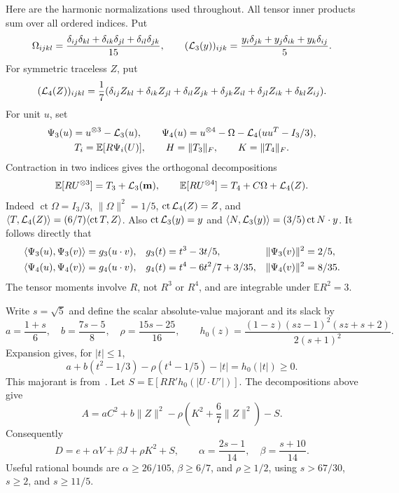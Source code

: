 \documentclass[11pt]{article}
\theoremstyle{remark}\newtheorem{remark}[theorem]{Remark}
\newcommand{\E}{\mathbb E}
\numberwithin{equation}{section}
\begin{document}
Here are the harmonic normalizations used throughout. All tensor inner
products sum over all ordered indices. Put
\[
 \Omega_{ijkl}=\frac{\delta_{ij}\delta_{kl}+\delta_{ik}\delta_{jl}
                           +\delta_{il}\delta_{jk}}{15},
 \qquad
 ({\cal L}_3(y))_{ijk}
       =\frac{y_i\delta_{jk}+y_j\delta_{ik}+y_k\delta_{ij}}5.
\]
For symmetric traceless $Z$, put
\[
 ({\cal L}_4(Z))_{ijkl}=\frac17(\delta_{ij}Z_{kl}+\delta_{ik}Z_{jl}
 +\delta_{il}Z_{jk}+\delta_{jk}Z_{il}+\delta_{jl}Z_{ik}+\delta_{kl}Z_{ij}).
\]
For unit $u$, set
\[
 \begin{gathered}
 \Psi_3(u)=u^{\otimes3}-{\cal L}_3(u),\qquad
 \Psi_4(u)=u^{\otimes4}-\Omega-{\cal L}_4(uu^T-I_3/3),\\
 T_i=\E[R\Psi_i(U)],\qquad H=\|T_3\|_F,\qquad K=\|T_4\|_F.
 \end{gathered}
\]
Contraction in two indices gives the orthogonal decompositions
\[
 \E[R U^{\otimes3}]=T_3+{\cal L}_3(\mathbf m),\qquad
 \E[R U^{\otimes4}]=T_4+C\Omega+{\cal L}_4(Z).
\]
Indeed $\operatorname{ct}\Omega=I_3/3$, $\|\Omega\|^2=1/5$,
$\operatorname{ct}{\cal L}_4(Z)=Z$, and
$\langle T,{\cal L}_4(Z)\rangle=(6/7)\langle\operatorname{ct}T,Z\rangle$.
Also $\operatorname{ct}{\cal L}_3(y)=y$ and
$\langle N,{\cal L}_3(y)\rangle=(3/5)\operatorname{ct}N\cdot y$.
It follows directly that
\begin{align}\label{harmonics}
 \langle\Psi_3(u),\Psi_3(v)\rangle&=g_3(u\cdot v),&
 g_3(t)&=t^3-3t/5,&\|\Psi_3(v)\|^2&=2/5,\notag\\
 \langle\Psi_4(u),\Psi_4(v)\rangle&=g_4(u\cdot v),&
 g_4(t)&=t^4-6t^2/7+3/35,&\|\Psi_4(v)\|^2&=8/35.
\end{align}
The tensor moments involve $R$, not $R^3$ or $R^4$, and are integrable
under $\E R^2=3$.

Write $s=\sqrt5$ and define the scalar absolute-value majorant and its slack by
\[
 a=\frac{1+s}{6},\quad b=\frac{7s-5}{8},\quad\rho=\frac{15s-25}{16},
 \qquad h_0(z)=\frac{(1-z)(sz-1)^2(sz+s+2)}{2(s+1)^2}.
\]
Expansion gives, for $|t|\le1$,
\[
 a+b(t^2-1/3)-\rho(t^4-1/5)-|t|=h_0(|t|)\ge0.
\]
This majorant is from~\cite[Lemma 4.4]{STW}.
Let $S=\E[RR'h_0(|U\cdot U'|)]$. The decompositions above give
\[
 A=aC^2+b\|Z\|^2-\rho\left(K^2+\frac67\|Z\|^2\right)-S.
\]
Consequently
\begin{equation}\label{budget4}
 D=e+\alpha V+\beta J+\rho K^2+S,
 \qquad \alpha=\frac{2s-1}{14},\quad\beta=\frac{s+10}{14}.
\end{equation}
Useful rational bounds are $\alpha\ge26/105$, $\beta\ge6/7$,
and $\rho\ge1/2$, using $s>67/30$, $s\ge2$, and $s\ge11/5$.
\end{document}
